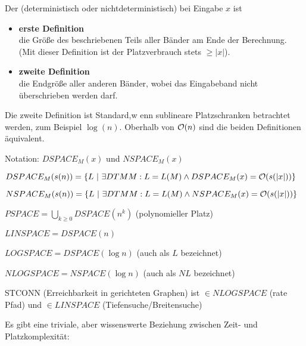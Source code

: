 \begin{definition}

    Der  (deterministisch oder nichtdeterministisch) bei Eingabe $x$ ist

    \begin{itemize}

        \item \textbf{erste Definition}\\
        die Größe des beschriebenen Teils aller Bänder am Ende der Berechnung. (Mit dieser Definition ist der Platzverbrauch stets $\geq |x|$).

        \item \textbf{zweite Definition}\\
        die Endgröße aller anderen Bänder, wobei das Eingabeband nicht überschrieben werden darf.

    \end{itemize}

    Die zweite Definition ist Standard,w enn sublineare Platzschranken betrachtet werden, zum Beispiel $\log(n)$. Oberhalb von $\mathcal{O}(n)$ sind die beiden Definitionen äquivalent.



    Notation: $DSPACE_M (x)$ und $NSPACE_M (x)$

    $DSPACE_M (s(n)) = \{   L  \ |\   \exists DTM M : L = L(M) \land DSPACE_M(x) = \mathcal{O}(s(|x|)) \}$

    $NSPACE_M (s(n)) = \{   L  \ |\   \exists DTM M : L = L(M) \land NSPACE_M(x) = \mathcal{O}(s(|x|)) \}$

    $PSPACE = \bigcup_{k \geq 0} DSPACE(n^k) $ (polynomieller Platz)

    $LINSPACE = DSPACE(n)$

    $LOGSPACE = DSPACE(\log n)$ (auch als $L$ bezeichnet)

    $NLOGSPACE = NSPACE(\log n)$ (auch als $NL$ bezeichnet)


\end{definition}


\begin{beispiel}

    STCONN (Erreichbarkeit in gerichteten Graphen) ist $\in NLOGSPACE$ (rate Pfad) und $\in LINSPACE$ (Tiefensuche/Breitensuche)

\end{beispiel}


Es gibt eine triviale, aber wissenswerte Beziehung zwischen Zeit- und Platzkomplexität:


